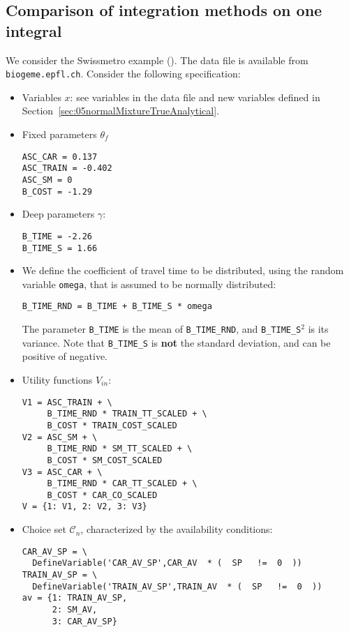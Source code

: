 \documentclass[12pt,a4paper]{article}
\newcommand{\C}{\mathcal{C}}
\begin{document}
\subsection{Comparison of integration methods on one integral}
We
consider the Swissmetro example (\cite{BierAxhaAbay01}). The data file
is available from \verb+biogeme.epfl.ch+. Consider the
following specification: 
\begin{itemize}
\item Variables $x$: see variables in the data file and new variables
  defined in Section~\ref{sec:05normalMixtureTrueAnalytical}. 
\item Fixed parameters $\theta_f$
\begin{lstlisting}
ASC_CAR = 0.137
ASC_TRAIN = -0.402
ASC_SM = 0
B_COST = -1.29
\end{lstlisting}
\item Deep parameters $\gamma$:
\begin{lstlisting}
B_TIME = -2.26
B_TIME_S = 1.66
\end{lstlisting}
\item We define the coefficient of travel time to be distributed,
  using the random variable \lstinline$omega$, that is assumed to be
  normally distributed:
\begin{lstlisting}
B_TIME_RND = B_TIME + B_TIME_S * omega
\end{lstlisting}
The parameter \lstinline$B_TIME$ is the mean of \lstinline$B_TIME_RND$, and
\lstinline$B_TIME_S$$^2$ is its variance. Note that
\lstinline$B_TIME_S$ is \textbf{not} the standard deviation, and can
be positive of negative. 
\item Utility functions $V_{in}$:
\begin{lstlisting}
V1 = ASC_TRAIN + \
     B_TIME_RND * TRAIN_TT_SCALED + \
     B_COST * TRAIN_COST_SCALED
V2 = ASC_SM + \
     B_TIME_RND * SM_TT_SCALED + \
     B_COST * SM_COST_SCALED
V3 = ASC_CAR + \
     B_TIME_RND * CAR_TT_SCALED + \
     B_COST * CAR_CO_SCALED
V = {1: V1, 2: V2, 3: V3}
\end{lstlisting}
\item Choice set $\C_n$, characterized by the availability conditions:
\begin{lstlisting}
CAR_AV_SP = \
  DefineVariable('CAR_AV_SP',CAR_AV  * (  SP   !=  0  ))
TRAIN_AV_SP = \
  DefineVariable('TRAIN_AV_SP',TRAIN_AV  * (  SP   !=  0  ))
av = {1: TRAIN_AV_SP,
      2: SM_AV,
      3: CAR_AV_SP}
\end{lstlisting}
\end{itemize}
\end{document}
